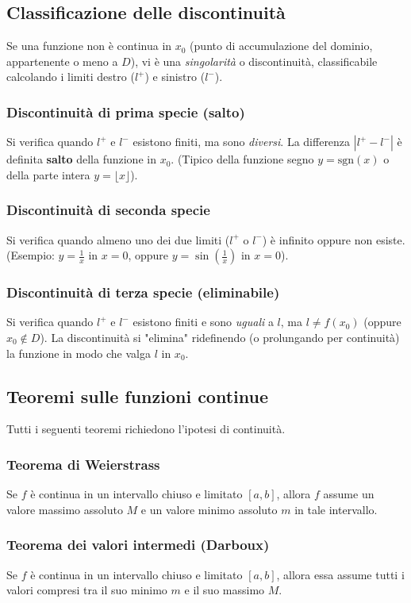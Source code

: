 \subsection{Classificazione delle discontinuità}
Se una funzione non è continua in $x_0$ (punto di accumulazione del dominio, appartenente o meno a $D$), vi è una \textit{singolarità} o discontinuità, classificabile calcolando i limiti destro ($l^+$) e sinistro ($l^-$).
\subsubsection{Discontinuità di prima specie (salto)}
Si verifica quando $l^+$ e $l^-$ esistono finiti, ma sono \textit{diversi}. La differenza $|l^+ - l^-|$ è definita \textbf{salto} della funzione in $x_0$. (Tipico della funzione segno $y = \text{sgn}(x)$ o della parte intera $y = \lfloor x \rfloor$).

\subsubsection{Discontinuità di seconda specie}
Si verifica quando almeno uno dei due limiti ($l^+$ o $l^-$) è infinito oppure non esiste. (Esempio: $y = \frac{1}{x}$ in $x=0$, oppure $y = \sin\left(\frac{1}{x}\right)$ in $x=0$).

\subsubsection{Discontinuità di terza specie (eliminabile)}
Si verifica quando $l^+$ e $l^-$ esistono finiti e sono \textit{uguali} a $l$, ma $l \neq f(x_0)$ (oppure $x_0 \notin D$). La discontinuità si "elimina" ridefinendo (o prolungando per continuità) la funzione in modo che valga $l$ in $x_0$.

\subsection{Teoremi sulle funzioni continue}
Tutti i seguenti teoremi richiedono l'ipotesi di continuità.
\subsubsection{Teorema di Weierstrass}
Se $f$ è continua in un intervallo chiuso e limitato $[a, b]$, allora $f$ assume un valore massimo assoluto $M$ e un valore minimo assoluto $m$ in tale intervallo.

\subsubsection{Teorema dei valori intermedi (Darboux)}
Se $f$ è continua in un intervallo chiuso e limitato $[a,b]$, allora essa assume tutti i valori compresi tra il suo minimo $m$ e il suo massimo $M$. 

